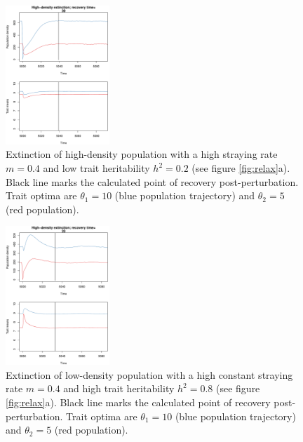 \documentclass[twocolumn,preprintnumbers,amsmath,amssymb,superscriptaddress]{revtex4}
\begin{document}
\begin{figure}
  \captionsetup{justification=raggedright,
singlelinecheck=false
}
\centering
\includegraphics[width=0.35\textwidth]{figs2/fig_relax_large.pdf}
\caption{
Extinction of high-density population with a high straying rate $m=0.4$ and low trait heritability $h^2=0.2$ (see figure \ref{fig:relax}a).
Black line marks the calculated point of recovery post-perturbation.
Trait optima are $\theta_1 = 10$ (blue population trajectory) and $\theta_2 = 5$ (red population).
} \label{fig:relaxtraj_hdlh}
\end{figure}

\begin{figure}
  \captionsetup{justification=raggedright,
singlelinecheck=false
}
\centering
\includegraphics[width=0.35\textwidth]{figs2/fig_relax_small_highh.pdf}
\caption{
Extinction of low-density population with a high constant straying rate $m=0.4$ and high trait heritability $h^2=0.8$ (see figure \ref{fig:relax}a).
Black line marks the calculated point of recovery post-perturbation.
Trait optima are $\theta_1 = 10$ (blue population trajectory) and $\theta_2 = 5$ (red population).
} \label{fig:relaxtraj_ldhh}
\end{figure}
\end{document}
